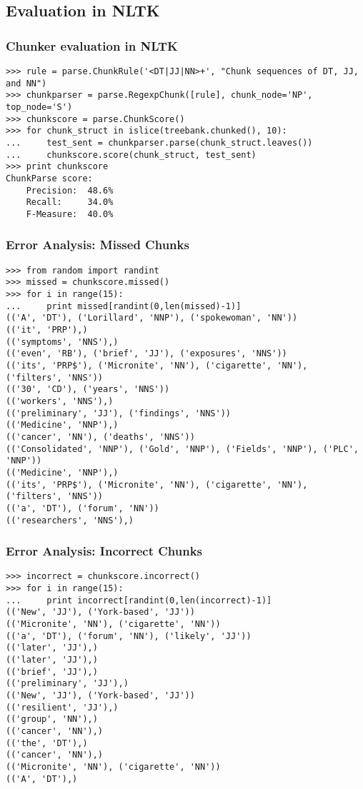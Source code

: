 \documentclass{beamer}             %
\begin{document}
\subsection{Evaluation in NLTK}

\begin{frame}[fragile]
  \frametitle{Chunker evaluation in NLTK}
  \scriptsize

\begin{verbatim}
>>> rule = parse.ChunkRule('<DT|JJ|NN>+', "Chunk sequences of DT, JJ, and NN")
>>> chunkparser = parse.RegexpChunk([rule], chunk_node='NP', top_node='S')
>>> chunkscore = parse.ChunkScore()
>>> for chunk_struct in islice(treebank.chunked(), 10):
...     test_sent = chunkparser.parse(chunk_struct.leaves())
...     chunkscore.score(chunk_struct, test_sent)
>>> print chunkscore
ChunkParse score:
    Precision:  48.6%
    Recall:     34.0%
    F-Measure:  40.0%
\end{verbatim}
\end{frame}

\begin{frame}[fragile]
  \frametitle{Error Analysis: Missed Chunks}
  \scriptsize

\begin{verbatim}
>>> from random import randint
>>> missed = chunkscore.missed()
>>> for i in range(15):
...     print missed[randint(0,len(missed)-1)]
(('A', 'DT'), ('Lorillard', 'NNP'), ('spokewoman', 'NN'))
(('it', 'PRP'),)
(('symptoms', 'NNS'),)
(('even', 'RB'), ('brief', 'JJ'), ('exposures', 'NNS'))
(('its', 'PRP$'), ('Micronite', 'NN'), ('cigarette', 'NN'), ('filters', 'NNS'))
(('30', 'CD'), ('years', 'NNS'))
(('workers', 'NNS'),)
(('preliminary', 'JJ'), ('findings', 'NNS'))
(('Medicine', 'NNP'),)
(('cancer', 'NN'), ('deaths', 'NNS'))
(('Consolidated', 'NNP'), ('Gold', 'NNP'), ('Fields', 'NNP'), ('PLC', 'NNP'))
(('Medicine', 'NNP'),)
(('its', 'PRP$'), ('Micronite', 'NN'), ('cigarette', 'NN'), ('filters', 'NNS'))
(('a', 'DT'), ('forum', 'NN'))
(('researchers', 'NNS'),)
\end{verbatim}
\end{frame}

\begin{frame}[fragile]
  \frametitle{Error Analysis: Incorrect Chunks}
  \scriptsize

\begin{verbatim}
>>> incorrect = chunkscore.incorrect()
>>> for i in range(15):
...     print incorrect[randint(0,len(incorrect)-1)]
(('New', 'JJ'), ('York-based', 'JJ'))
(('Micronite', 'NN'), ('cigarette', 'NN'))
(('a', 'DT'), ('forum', 'NN'), ('likely', 'JJ'))
(('later', 'JJ'),)
(('later', 'JJ'),)
(('brief', 'JJ'),)
(('preliminary', 'JJ'),)
(('New', 'JJ'), ('York-based', 'JJ'))
(('resilient', 'JJ'),)
(('group', 'NN'),)
(('cancer', 'NN'),)
(('the', 'DT'),)
(('cancer', 'NN'),)
(('Micronite', 'NN'), ('cigarette', 'NN'))
(('A', 'DT'),)
\end{verbatim}
\end{frame}
\end{document}
